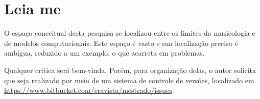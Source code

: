 \chapter*[Introdução]{Leia me}

O espaço conceitual desta pesquisa se localizou entre os limites da musicologia e de modelos computacionais. Este espaço é vasto e sua localização precisa é ambígua, reduzido a um exemplo, o que acarreta em problemas.

Qualquer critica será bem-vinda. Porém, para organização delas, o autor solicita que seja realizado por meio de um sistema de controle de versões, localizado em \url{https://www.bitbucket.com/cravista/mestrado/issues}. 
